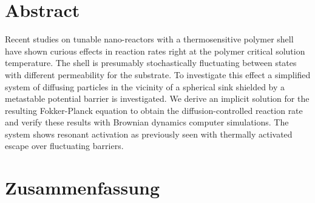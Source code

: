 \section*{Abstract}
Recent studies on tunable nano-reactors with a thermosensitive polymer shell have shown curious effects in reaction rates
right at the polymer critical solution temperature.
The shell is presumably stochastically fluctuating between states with different permeability for the substrate.
To investigate this effect a simplified system of diffusing particles in the vicinity of a spherical sink shielded by a metastable potential barrier is investigated. We derive an implicit solution for the resulting Fokker-Planck equation to obtain the diffusion-controlled reaction rate and verify these results with Brownian dynamics computer simulations. The system shows resonant activation as previously seen with thermally activated escape over fluctuating barriers.

\newpage
\section*{Zusammenfassung}

\newpage
\tableofcontents
\newpage
